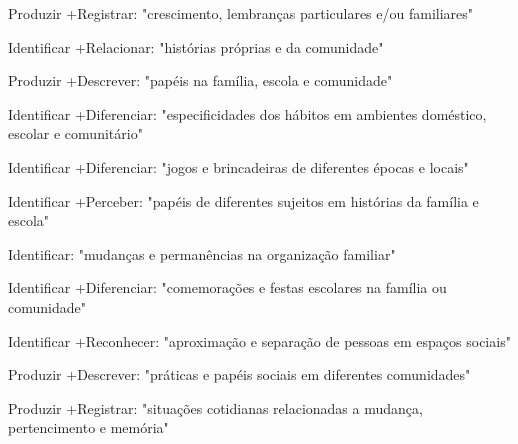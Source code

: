  Produzir +Registrar: "crescimento, lembranças particulares e/ou familiares"

 Identificar +Relacionar: "histórias próprias e da comunidade"

 Produzir +Descrever: "papéis na família, escola e comunidade"

 Identificar +Diferenciar: "especificidades dos hábitos em ambientes doméstico, escolar e comunitário"

 Identificar +Diferenciar: "jogos e brincadeiras de diferentes épocas e locais"

 Identificar +Perceber: "papéis de diferentes sujeitos em histórias da família e escola"

 Identificar: "mudanças e permanências na organização familiar"

 Identificar +Diferenciar: "comemorações e festas escolares na família ou comunidade"

 Identificar +Reconhecer: "aproximação e separação de pessoas em espaços sociais"

 Produzir +Descrever: "práticas e papéis sociais em diferentes comunidades"

 Produzir +Registrar: "situações cotidianas relacionadas a mudança, pertencimento e memória"

